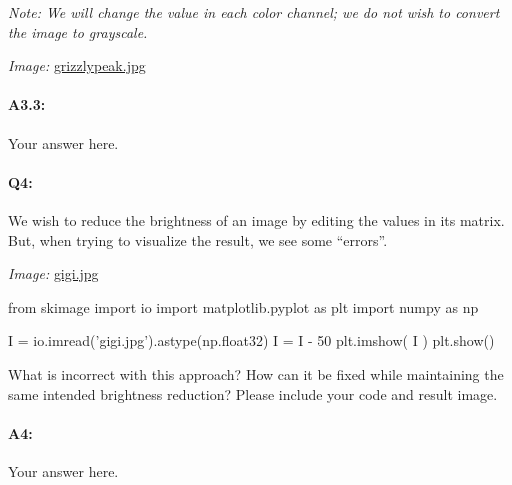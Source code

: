 \documentclass[11pt]{article}
\begin{document}
\emph{Note: We will change the value in each color channel; we do not wish to convert the image to grayscale.}

\emph{Image:} \href{grizzlypeak.jpg}{grizzlypeak.jpg}

\paragraph{A3.3:} Your answer here.




\pagebreak
\paragraph{Q4:} We wish to reduce the brightness of an image by editing the values in its matrix. But, when trying to visualize the result, we see some ``errors''.

\emph{Image:} \href{gigi.jpg}{gigi.jpg}

\begin{python}
from skimage import io
import matplotlib.pyplot as plt
import numpy as np

I =  io.imread('gigi.jpg').astype(np.float32)
I = I - 50
plt.imshow( I )
plt.show()
\end{python}

What is incorrect with this approach? How can it be fixed while maintaining the same intended brightness reduction? Please include your code and result image.

\paragraph{A4:} Your answer here.



\end{document}
